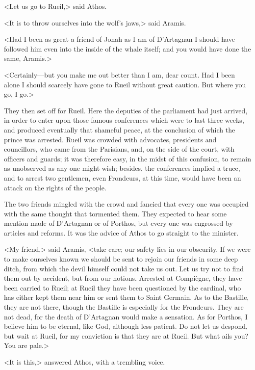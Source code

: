 <Let us go to Rueil,> said Athos.

<It is to throw ourselves into the wolf's jaws,> said Aramis.

<Had I been as great a friend of Jonah as I am of D'Artagnan I should have followed him even into the inside of the whale itself; and you would have done the same, Aramis.>

<Certainly—but you make me out better than I am, dear count. Had I been alone I should scarcely have gone to Rueil without great caution. But where you go, I go.>

They then set off for Rueil. Here the deputies of the parliament had just arrived, in order to enter upon those famous conferences which were to last three weeks, and produced eventually that shameful peace, at the conclusion of which the prince was arrested. Rueil was crowded with advocates, presidents and councillors, who came from the Parisians, and, on the side of the court, with officers and guards; it was therefore easy, in the midst of this confusion, to remain as unobserved as any one might wish; besides, the conferences implied a truce, and to arrest two gentlemen, even Frondeurs, at this time, would have been an attack on the rights of the people.

The two friends mingled with the crowd and fancied that every one was occupied with the same thought that tormented them. They expected to hear some mention made of D'Artagnan or of Porthos, but every one was engrossed by articles and reforms. It was the advice of Athos to go straight to the minister.

<My friend,> said Aramis, <take care; our safety lies in our obscurity. If we were to make ourselves known we should be sent to rejoin our friends in some deep ditch, from which the devil himself could not take us out. Let us try not to find them out by accident, but from our notions. Arrested at Compiègne, they have been carried to Rueil; at Rueil they have been questioned by the cardinal, who has either kept them near him or sent them to Saint Germain. As to the Bastille, they are not there, though the Bastille is especially for the Frondeurs. They are not dead, for the death of D'Artagnan would make a sensation. As for Porthos, I believe him to be eternal, like God, although less patient. Do not let us despond, but wait at Rueil, for my conviction is that they are at Rueil. But what ails you? You are pale.>

<It is this,> answered Athos, with a trembling voice.

